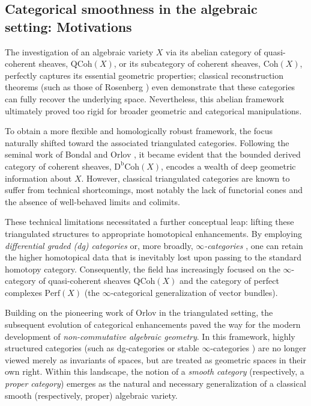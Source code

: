 \documentclass[oneside, hidelinks, 12pt, a4paper,reqno]{amsart}
\theoremstyle{plain}
\theoremstyle{definition}
\theoremstyle{plain}
\newcommand{\Perf}{\mathrm{Perf}}
\newcommand{\cat}{$\infty$-category }
\newcommand{\cates}{$\infty$-categories }
\newcommand{\Qcoh}{\mathrm{QCoh}}
\begin{document}
\subsection{Categorical smoothness in the algebraic setting: Motivations}
The investigation of an algebraic variety $X$ via its abelian category of quasi-coherent sheaves, $\Qcoh(X)$, or its subcategory of coherent sheaves, $\mathrm{Coh}(X)$, perfectly captures its essential geometric properties; classical reconstruction theorems (such as those of Rosenberg \cite{brandenburg2013rosenberg}) even demonstrate that these categories can fully recover the underlying space. Nevertheless, this abelian framework ultimately proved too rigid for broader geometric and categorical manipulations.

To obtain a more flexible and homologically robust framework, the focus naturally shifted toward the associated triangulated categories. Following the seminal work of Bondal and Orlov \cite{bondal2001reconstruction}, it became evident that the bounded derived category of coherent sheaves, $\mathrm{D^{b}Coh}(X)$, encodes a wealth of deep geometric information about $X$. However, classical triangulated categories are known to suffer from technical shortcomings, most notably the lack of functorial cones and the absence of well-behaved limits and colimits.

These technical limitations necessitated a further conceptual leap: lifting these triangulated structures to appropriate homotopical enhancements. By employing \emph{differential graded (dg) categories} or, more broadly, \emph{\cates}, one can retain the higher homotopical data that is inevitably lost upon passing to the standard homotopy category. Consequently, the field has increasingly focused on the \cat of quasi-coherent sheaves $\Qcoh(X)$ and the category of perfect complexes $\Perf(X)$ (the $\infty$-categorical generalization of vector bundles).

Building on the pioneering work of Orlov \cite{Orlov_2016noncommutativeschemes} in the triangulated setting, the subsequent evolution of categorical enhancements paved the way for the modern development of \emph{non-commutative algebraic geometry}. In this framework, highly structured categories (such as dg-categories or stable \cates) are no longer viewed merely as invariants of spaces, but are treated as geometric spaces in their own right. Within this landscape, the notion of a \emph{smooth category} (respectively, a \emph{proper category}) emerges as the natural and necessary generalization of a classical smooth (respectively, proper) algebraic variety.
\end{document}
